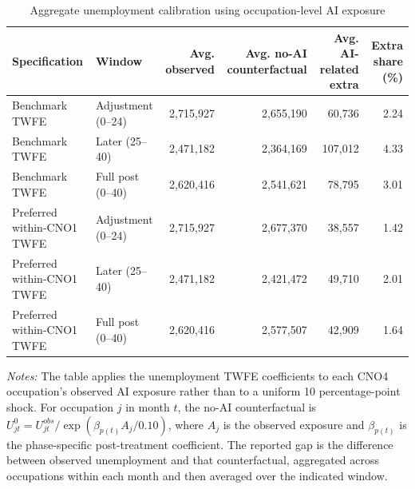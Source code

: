 \begin{table}[!htbp]
\centering
\caption{Aggregate unemployment calibration using occupation-level AI exposure}
\label{tab:v1_calibration_aggregate}
\begin{threeparttable}
\scriptsize
\setlength{\tabcolsep}{4pt}
\begin{tabular}{llrrrr}
\toprule
Specification & Window & Avg. observed & Avg. no-AI counterfactual & Avg. AI-related extra & Extra share (\%) \\
\midrule
Benchmark TWFE & Adjustment (0--24) & 2,715,927 & 2,655,190 & 60,736 & 2.24 \\
Benchmark TWFE & Later (25--40) & 2,471,182 & 2,364,169 & 107,012 & 4.33 \\
Benchmark TWFE & Full post (0--40) & 2,620,416 & 2,541,621 & 78,795 & 3.01 \\
Preferred within-CNO1 TWFE & Adjustment (0--24) & 2,715,927 & 2,677,370 & 38,557 & 1.42 \\
Preferred within-CNO1 TWFE & Later (25--40) & 2,471,182 & 2,421,472 & 49,710 & 2.01 \\
Preferred within-CNO1 TWFE & Full post (0--40) & 2,620,416 & 2,577,507 & 42,909 & 1.64 \\
\bottomrule
\end{tabular}
\begin{tablenotes}[flushleft]
\footnotesize
\item \emph{Notes:} The table applies the unemployment TWFE coefficients to each CNO4 occupation's observed AI exposure rather than to a uniform 10 percentage-point shock. For occupation $j$ in month $t$, the no-AI counterfactual is $U_{jt}^{0}=U_{jt}^{obs}/\exp(\beta_{p(t)} A_j/0.10)$, where $A_j$ is the observed exposure and $\beta_{p(t)}$ is the phase-specific post-treatment coefficient. The reported gap is the difference between observed unemployment and that counterfactual, aggregated across occupations within each month and then averaged over the indicated window.
\end{tablenotes}
\end{threeparttable}
\end{table}
